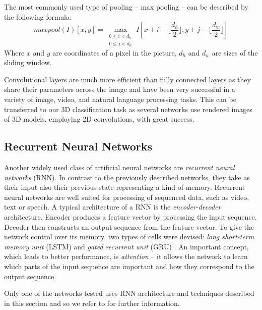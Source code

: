 The most commonly used type of pooling -- max pooling -- can be described by the following formula: 
$$maxpool(I)[x,y] =
\max_{\substack{0 \leq i < d_h\\
		0 \leq j < d_w}}
I[x + i - \lfloor \frac{d_h}{2} \rfloor, y + j - \lfloor \frac{d_w}{2}  \rfloor ] $$ Where $x$ and $y$ are coordinates of a pixel in the picture, $d_h$ and $d_w$ are sizes of the sliding window.\par
Convolutional layers are much more efficient than fully connected layers as they share their parameters across the image and have been very successful in a variety of image, video, and natural language processing tasks. This  can be transferred to our 3D classification task as several networks use rendered images of 3D models, employing 2D convolutions, with great success.

\subsection{Recurrent Neural Networks}
Another widely used class of artificial neural networks are \textit{recurrent neural networks} (RNN). In contrast to the previously described networks, they take as their input also their previous state representing a kind of memory. Recurrent neural networks are well suited for processing of sequenced data, such as video, text or speech. A typical architecture of a RNN is the \textit{encoder-decoder} architecture. Encoder produces a feature vector by processing the input sequence. Decoder then constructs an output sequence from the feature vector. To give the network control over its memory, two types of cells were devised: \textit{long short-term memory unit} (LSTM) \cite{hochreiter_long_1997} and \textit{gated recurrent unit} (GRU) \cite{cho_learning_2014}. An important concept, which leads to better performance, is \textit{attention} \cite{bahdanau_neural_2014} -- it allows the network to learn which parts of the input sequence are important and how they correspond to the output sequence.\par
Only one of the networks tested uses RNN architecture and techniques described in this section and  so we refer to \cite{goodfellow_deep_2016} for further information. 

